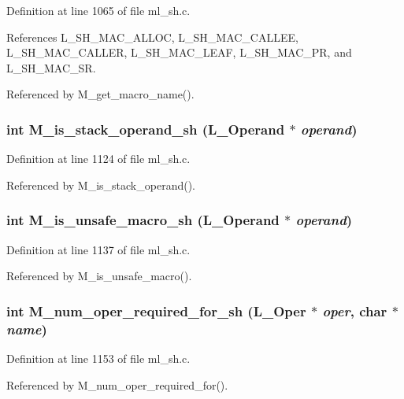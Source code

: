 Definition at line 1065 of file ml\_\-sh.c.

References L\_\-SH\_\-MAC\_\-ALLOC, L\_\-SH\_\-MAC\_\-CALLEE, L\_\-SH\_\-MAC\_\-CALLER, L\_\-SH\_\-MAC\_\-LEAF, L\_\-SH\_\-MAC\_\-PR, and L\_\-SH\_\-MAC\_\-SR.

Referenced by M\_\-get\_\-macro\_\-name().
\subsubsection{\setlength{\rightskip}{0pt plus 5cm}int M\_\-is\_\-stack\_\-operand\_\-sh (L\_\-Operand $\ast$ {\em operand})}\label{m__sh_8h_88ed83827378c9bba80cda3d07304db6}




Definition at line 1124 of file ml\_\-sh.c.

Referenced by M\_\-is\_\-stack\_\-operand().
\subsubsection{\setlength{\rightskip}{0pt plus 5cm}int M\_\-is\_\-unsafe\_\-macro\_\-sh (L\_\-Operand $\ast$ {\em operand})}\label{m__sh_8h_f997d65c0a0b45cbdd7b4cdd8093bc8c}




Definition at line 1137 of file ml\_\-sh.c.

Referenced by M\_\-is\_\-unsafe\_\-macro().
\subsubsection{\setlength{\rightskip}{0pt plus 5cm}int M\_\-num\_\-oper\_\-required\_\-for\_\-sh (L\_\-Oper $\ast$ {\em oper}, char $\ast$ {\em name})}\label{m__sh_8h_ce5d1c89e44517211b2fbeaf36ad8a38}




Definition at line 1153 of file ml\_\-sh.c.

Referenced by M\_\-num\_\-oper\_\-required\_\-for().
